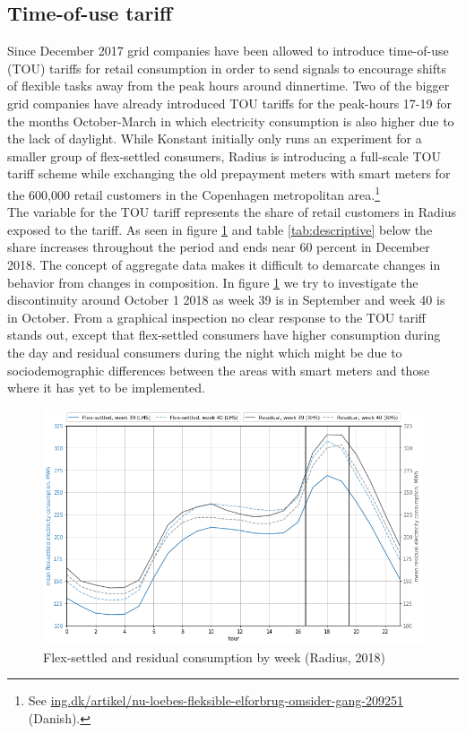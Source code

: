 \subsection{Time-of-use tariff}
\label{subsec:d_tout}
Since December 2017 grid companies have been allowed to introduce time-of-use (TOU) tariffs for retail consumption in order to send signals to encourage shifts of flexible tasks away from the peak hours around dinnertime. Two of the bigger grid companies have already introduced TOU tariffs for the peak-hours 17-19 for the months October-March in which electricity consumption is also higher due to the lack of daylight. While Konstant initially only runs an experiment for a smaller group of flex-settled consumers, Radius is introducing a full-scale TOU tariff scheme while exchanging the old prepayment meters with smart meters for the 600,000 retail customers in the Copenhagen metropolitan area.\footnote{See \href{https://ing.dk/artikel/nu-loebes-fleksible-elforbrug-omsider-gang-209251}{ing.dk/artikel/nu-loebes-fleksible-elforbrug-omsider-gang-209251} (Danish).}
\medskip\\
The variable for the TOU tariff represents the share of retail customers in Radius exposed to the tariff. As seen in figure \ref{fig:radius_w39_w40} and table \ref{tab:descriptive} below the share increases throughout the period and ends near 60 percent in December 2018. The concept of aggregate data makes it difficult to demarcate changes in behavior from changes in composition. In figure \ref{fig:radius_w39_w40} we try to investigate the discontinuity around October 1 2018 as week 39 is in September and week 40 is in October. From a graphical inspection no clear response to the TOU tariff stands out, except that flex-settled consumers have higher consumption during the day and residual consumers during the night which might be due to sociodemographic differences between the areas with smart meters and those where it has yet to be implemented.
\begin{figure}[H]
  \centering
  \caption{Flex-settled and residual consumption by week (Radius, 2018)}
  \label{fig:radius_w39_w40}
      \includegraphics[width=1 \textwidth]{03_figures/radius_w39_w40}
\end{figure}

